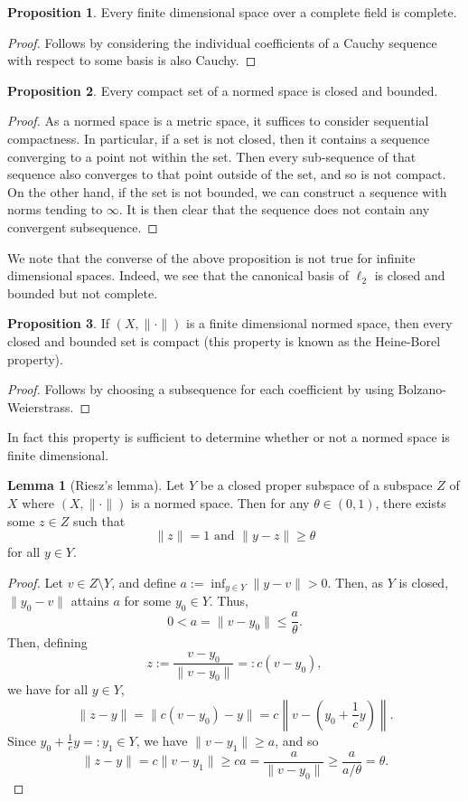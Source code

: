 \documentclass[]{article}
\theoremstyle{definition}
\theoremstyle{definition}
\newtheorem{lemma}{Lemma}[section]
\newtheorem{proposition}{Proposition}[section]
\begin{document}
\begin{proposition}
  Every finite dimensional space over a complete field is complete.
\end{proposition}
\begin{proof}
  Follows by considering the individual coefficients of a Cauchy sequence with 
  respect to some basis is also Cauchy.
\end{proof}

\begin{proposition}
  Every compact set of a normed space is closed and bounded.
\end{proposition}
\begin{proof}
  As a normed space is a metric space, it suffices to consider sequential compactness. 
  In particular, if a set is not closed, then it contains a sequence converging 
  to a point not within the set. Then every sub-sequence of that sequence also 
  converges to that point outside of the set, and so is not compact. On the other 
  hand, if the set is not bounded, we can construct a sequence with norms 
  tending to \(\infty\). It is then clear that the sequence does not contain any 
  convergent subsequence.
\end{proof}

We note that the converse of the above proposition is not true for infinite 
dimensional spaces. Indeed, we see that the canonical basis of \(\ell_2\) 
is closed and bounded but not complete.

\begin{proposition}
  If \((X, \|\cdot\|)\) is a finite dimensional normed space, then every closed 
  and bounded set is compact (this property is known as the Heine-Borel property). 
\end{proposition}
\begin{proof}
  Follows by choosing a subsequence for each coefficient by using 
  Bolzano-Weierstrass.
\end{proof}

In fact this property is sufficient to determine whether or not a normed space 
is finite dimensional.

\begin{lemma}[Riesz's lemma]
  Let \(Y\) be a closed proper subspace of a subspace \(Z\) of \(X\) where 
  \((X, \|\cdot\|)\) is a normed space. Then 
  for any \(\theta \in (0, 1)\), there exists some \(z \in Z\) such that 
  \[\|z\| = 1 \text{ and } \|y - z\| \ge \theta\]
  for all \(y \in Y\). 
\end{lemma}
\begin{proof}
  Let \(v \in Z \setminus Y\), and define \(a := \inf_{y \in Y} \|y - v\| > 0\). 
  Then, as \(Y\) is closed, \(\|y_0 - v\|\) attains \(a\) for some \(y_0 \in Y\). 
  Thus, 
  \[0 < a = \|v - y_0\| \le \frac{a}{\theta}.\]
  Then, defining 
  \[z := \frac{v - y_0}{\|v - y_0\|} =: c(v - y_0),\]
  we have for all \(y \in Y\),
  \[\|z - y\| = \|c(v - y_0) - y\| = 
    c\left\|v - \left(y_0 + \frac{1}{c}y\right)\right\|.\]
  Since \(y_0 + \frac{1}{c}y =: y_1 \in Y\), we have \(\|v - y_1\| \ge a\), 
  and so 
  \[\|z - y\| = c\|v - y_1\| \ge ca = \frac{a}{\|v - y_0\|} \ge 
    \frac{a}{a / \theta} = \theta.\]
\end{proof}
\end{document}
